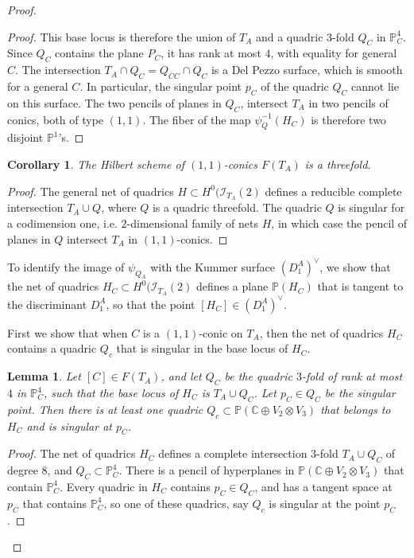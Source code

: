 \documentclass[a4paper,11pt]{amsart}
\newtheorem{cor}[thm]{Corollary}
\newtheorem{lemma}[thm]{Lemma}
\theoremstyle{definition}
\numberwithin{equation}{section}
\numberwithin{equation}{section} \theoremstyle{definition}
\begin{document}
\begin{proof}
\begin{proof}
This base locus is therefore the union of $T_A$ and a quadric $3$-fold $Q_{C}$ in ${{\mathbb{P}}}^4_C$.   Since $Q_{C}$ contains the plane $P_C$, it has rank at most $4$, with equality for  general $C$.  
The intersection $T_A\cap Q_{C}= Q_{CC}\cap Q_{C}$ is a Del Pezzo surface, which is smooth for a general $C$. In particular, the singular point $p_C$ of the quadric $Q_{C}$ cannot lie on this surface.   The two pencils of planes in $Q_{C}$, intersect $T_A$ in two pencils of conics, both of type $(1,1)$.  The fiber of  the map $\psi_{Q}^{-1}(H_{C})$ is therefore two disjoint ${{\mathbb{P}}}^1$'s.  
\end{proof} 
\begin{cor} The Hilbert scheme of $(1,1)$-conics $F(T_A)$ is a threefold.
\end{cor}
\begin{proof} The general net of quadrics $H\subset H^0({\mathcal I}_{T_A}(2)$ defines a reducible complete intersection $T_A\cup Q$, where $Q$ is a quadric threefold. The quadric $Q$ is singular for a codimension one, i.e. $2$-dimensional family of nets $H$, in which case the pencil of planes in $Q$ intersect $T_A$ in $(1,1)$-conics.
\end{proof}
To identify the image of $\psi_{Q_A}$ with the  Kummer surface $(D_1^A)^\vee$, 
we show that the net of quadrics $H_C\subset  H^0({\mathcal I}_{T_A}(2)$  defines a plane ${{\mathbb{P}}}(H_C)$ that is tangent to the discriminant $D_1^A$, so that the point $[H_C]\in (D_1^A)^\vee$.

First we show that when $C$ is a $(1,1)$-conic on $T_A$, then the net of quadrics $H_C$ contains a quadric $Q_c$ that is singular in the base locus of $H_C$.
\begin{lemma}\label{Q_c}  Let $[C]\in F(T_A)$, and let $Q_{C}$ be the quadric $3$-fold of rank at most $4$ in ${{\mathbb{P}}}^4_C$, such that the base locus of $H_C$ is $T_A\cup Q_C$.   Let $p_C\in Q_{C}$ be the singular point.
Then there is at least one quadric $Q_c\subset {{\mathbb{P}}}({{\mathbb{C}  }}\oplus V_2\otimes V_3)$ that belongs to  $H_{C}$  and is singular at $p_C$.
\end{lemma}
\begin{proof}
The net of quadrics $H_{C}$ defines a complete intersection 3-fold $T_A\cup Q_{C}$ of degree 8, and  $Q_{C}\subset {{\mathbb{P}}}^4_C$.
There is a pencil of hyperplanes in ${{\mathbb{P}}}({{\mathbb{C}  }}\oplus V_2\otimes V_3)$ that contain ${{\mathbb{P}}}^4_C$. Every quadric in $H_{C}$ contains $p_C\in Q_{C}$, and has a tangent space at $p_C$  that contains ${{\mathbb{P}}}^4_C$, so one of these quadrics, say $Q_c$ is singular at the point $p_C$.  
\end{proof}


\end{proof}
\end{document}
